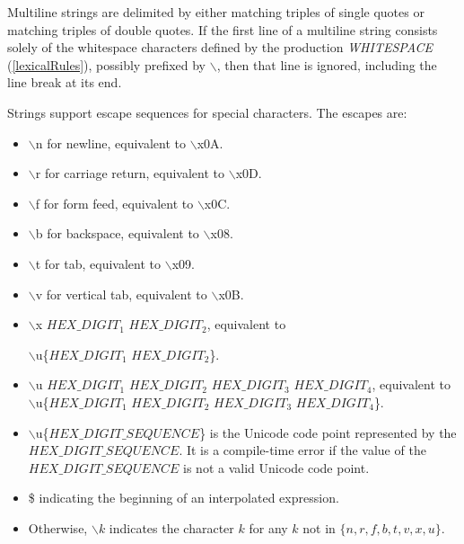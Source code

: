 \documentclass{article}
\begin{document}
\LMHash{}
Multiline strings are delimited by either matching triples of single quotes or matching triples of double quotes.
If the first line of a multiline string consists solely of the whitespace characters defined by the production {\em WHITESPACE} (\ref{lexicalRules}), possibly prefixed by $\backslash$, then that line is ignored, including the line break at its end.



\LMHash{}
Strings support escape sequences for special characters.
The escapes are:
\begin{itemize}
\item $\backslash$n for newline, equivalent to $\backslash$x0A.
\item $\backslash$r for carriage return, equivalent to $\backslash$x0D.
\item $\backslash$f for form feed, equivalent to $\backslash$x0C.
\item $\backslash$b for backspace, equivalent to $\backslash$x08.
\item $\backslash$t for tab, equivalent to $\backslash$x09.
\item $\backslash$v for vertical tab, equivalent to $\backslash$x0B.
\item $\backslash$x $HEX\_DIGIT_1$ $HEX\_DIGIT_2$, equivalent to

$\backslash$u\{$HEX\_DIGIT_1$ $HEX\_DIGIT_2$\}.
\item $\backslash$u $HEX\_DIGIT_1$ $HEX\_DIGIT_2$ $HEX\_DIGIT_3$ $HEX\_DIGIT_4$, equivalent to $\backslash$u\{$HEX\_DIGIT_1$ $HEX\_DIGIT_2$ $HEX\_DIGIT_3$ $HEX\_DIGIT_4$\}.
\item $\backslash$u\{$HEX\_DIGIT\_SEQUENCE$\} is the Unicode code point represented by the $HEX\_DIGIT\_SEQUENCE$.
It is a compile-time error if the value of the $HEX\_DIGIT\_SEQUENCE$ is not a valid Unicode code point.
\item \$ indicating the beginning of an interpolated expression.
\item Otherwise, $\backslash k$ indicates the character $k$ for any $k$ not in $\{n, r, f, b, t, v, x, u\}$.
\end{itemize}
\end{document}
